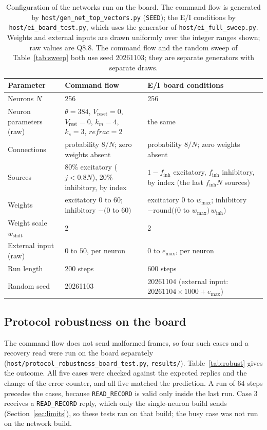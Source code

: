 \documentclass[11pt]{article}
\begin{document}
\begin{table}[t]
\centering
\caption{Configuration of the networks run on the board. The command flow is generated by \texttt{host/gen\_net\_top\_vectors.py} (\texttt{SEED}); the E/I conditions by \texttt{host/ei\_board\_test.py}, which uses the generator of \texttt{host/ei\_full\_sweep.py}. Weights and external inputs are drawn uniformly over the integer ranges shown; raw values are Q8.8. The command flow and the random sweep of Table~\ref{tab:sweep} both use seed 20261103; they are separate generators with separate draws.}
\label{tab:netcfg}
\begin{tabular}{p{4.2cm}p{5.2cm}p{5.2cm}}
\toprule
Parameter & Command flow & E/I board conditions \\
\midrule
Neurons $N$ & 256 & 256 \\
Neuron parameters (raw) & $\theta=384$, $V_{\mathrm{reset}}=0$, $V_{\mathrm{rest}}=0$, $k_m=4$, $k_s=3$, $\mathit{refrac}=2$ & the same \\
Connections & probability $8/N$; zero weights absent & probability $8/N$; zero weights absent \\
Sources & 80\% excitatory ($j < 0.8N$), 20\% inhibitory, by index & $1-f_{\mathrm{inh}}$ excitatory, $f_{\mathrm{inh}}$ inhibitory, by index (the last $f_{\mathrm{inh}}N$ sources) \\
Weights & excitatory $0$ to $60$; inhibitory $-(0$ to $60)$ & excitatory $0$ to $w_{\max}$; inhibitory $-\mathrm{round}((0$ to $w_{\max})\,w_{\mathrm{inh}})$ \\
Weight scale $w_{\mathrm{shift}}$ & 2 & 2 \\
External input (raw) & $0$ to $50$, per neuron & $0$ to $e_{\max}$, per neuron \\
Run length & 200 steps & 600 steps \\
Random seed & 20261103 & 20261104 (external input: $20261104 \times 1000 + e_{\max}$) \\
\bottomrule
\end{tabular}
\end{table}

\subsection{Protocol robustness on the board}
\label{sec:robust}
The command flow does not send malformed frames, so four such cases and a recovery read were run on the board separately (\texttt{host/protocol\_robustness\_board\_test.py}, \texttt{results/}). Table~\ref{tab:robust} gives the outcome. All five cases were checked against the expected replies and the change of the error counter, and all five matched the prediction. A run of 64 steps precedes the cases, because \texttt{READ\_RECORD} is valid only inside the last run. Case 3 receives a \texttt{READ\_RECORD} reply, which only the single-neuron build sends (Section~\ref{sec:limits}), so these tests ran on that build; the busy case was not run on the network build.
\end{document}
